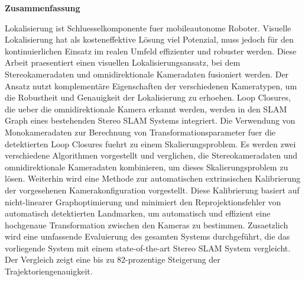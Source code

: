 
\clearemptydoublepage
{}
{}

\vspace*{1cm}
\begin{center}
{\Large \bf Zusammenfassung}
\end{center}
\vspace{1cm}

Lokalisierung ist Schluesselkomponente fuer mobileautonome Roboter. Visuelle Lokalisierung hat als kosteneffektive Lösung viel Potenzial, muss jedoch für den kontinuierlichen Einsatz im realen Umfeld effizienter und robuster werden. Diese Arbeit praesentiert einen visuellen Lokalisierungsansatz, bei dem Stereokameradaten und omnidirektionale Kameradaten fusioniert werden. Der Ansatz nutzt komplementäre Eigenschaften der verschiedenen Kameratypen, um die Robustheit und Genauigkeit der Lokalisierung zu erhoehen. Loop Closures, die ueber die omnidirektionale Kamera erkannt werden, werden in den SLAM Graph eines bestehenden Stereo SLAM Systems integriert. Die Verwendung von Monokameradaten zur Berechnung von Transformationsparameter fuer die detektierten Loop Closures fuehrt zu einem Skalierungsproblem. Es werden zwei verschiedene Algorithmen vorgestellt und verglichen, die Stereokameradaten und omnidirektionale Kameradaten kombinieren, um dieses Skalierungsproblem zu lösen. Weiterhin wird eine Methode zur automatischen extrinsischen Kalibrierung der vorgesehenen Kamerakonfiguration vorgestellt. Diese Kalibrierung basiert auf nicht-linearer Graphoptimierung und minimiert den Reprojektionsfehler von automatisch detektierten Landmarken, um automatisch und effizient eine hochgenaue Transformation zwischen den Kameras zu bestimmen. Zusaetzlich wird eine umfassende Evaluierung des gesamten Systems durchgeführt, die das vorliegende System mit einem state-of-the-art Stereo SLAM System vergleicht. Der Vergleich zeigt eine bis zu 82-prozentige Steigerung der Trajektoriengenauigkeit.

